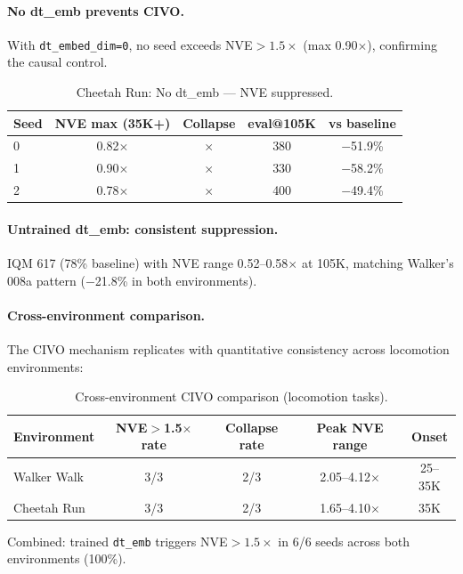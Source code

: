 \documentclass[letterpaper]{article}
\begin{document}
\paragraph{No dt\_emb prevents CIVO.}
With \texttt{dt\_embed\_dim=0}, no seed exceeds NVE$>1.5\times$ (max 0.90$\times$), confirming the causal control.

\begin{table}[h]
\centering
\caption{Cheetah Run: No dt\_emb --- NVE suppressed.}
\label{tab:cheetah_no_dtemb}
\begin{tabular}{lcccc}
\toprule
Seed & NVE max (35K+) & Collapse & eval@105K & vs baseline \\
\midrule
0 & 0.82$\times$ & $\times$ & 380 & $-$51.9\% \\
1 & 0.90$\times$ & $\times$ & 330 & $-$58.2\% \\
2 & 0.78$\times$ & $\times$ & 400 & $-$49.4\% \\
\bottomrule
\end{tabular}
\end{table}

\paragraph{Untrained dt\_emb: consistent suppression.}
IQM 617 (78\% baseline) with NVE range 0.52--0.58$\times$ at 105K, matching Walker's 008a pattern ($-$21.8\% in both environments).

\paragraph{Cross-environment comparison.}
The CIVO mechanism replicates with quantitative consistency across locomotion environments:

\begin{table}[h]
\centering
\caption{Cross-environment CIVO comparison (locomotion tasks).}
\label{tab:cross_env}
\begin{tabular}{lcccc}
\toprule
Environment & NVE$>$1.5$\times$ rate & Collapse rate & Peak NVE range & Onset \\
\midrule
Walker Walk & 3/3 & 2/3 & 2.05--4.12$\times$ & 25--35K \\
Cheetah Run & 3/3 & 2/3 & 1.65--4.10$\times$ & 35K \\
\bottomrule
\end{tabular}
\end{table}

Combined: trained \texttt{dt\_emb} triggers NVE$>1.5\times$ in 6/6 seeds across both environments (100\%).
\end{document}
